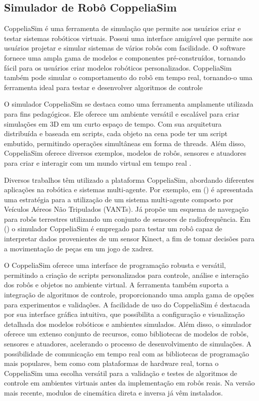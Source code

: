 \subsection{Simulador de Robô CoppeliaSim}

CoppeliaSim é uma ferramenta de simulação que permite aos usuários criar e testar sistemas robóticos virtuais. Possui uma interface amigável que permite aos usuários projetar e simular sistemas de vários robôs com facilidade. O software fornece uma ampla gama de modelos e componentes pré-construídos, tornando fácil para os usuários criar modelos robóticos personalizados. CoppeliaSim também pode simular o comportamento do robô em tempo real, tornando-o uma ferramenta ideal para testar e desenvolver algoritmos de controle \cite{nascimento2019}

O simulador CoppeliaSim se destaca como uma ferramenta amplamente utilizada para fins pedagógicos. Ele oferece um ambiente versátil e escalável para criar simulações em 3D em um curto espaço de tempo. Com sua arquitetura distribuída e baseada em scripts, cada objeto na cena pode ter um script embutido, permitindo operações simultâneas em forma de threads. Além disso, CoppeliaSim oferece diversos exemplos, modelos de robôs, sensores e atuadores para criar e interagir com um mundo virtual em tempo real \cite{Montenegro2022}.

 Diversos trabalhos têm utilizado a plataforma CoppeliaSim, abordando diferentes aplicações na robótica e sistemas multi-agente. Por exemplo, em  (\citeyear{Obdrzalek2017}) é apresentada uma estratégia para a utilização de um sistema multi-agente composto por Veículos Aéreos Não Tripulados (VANTs). Já  propõe um esquema de navegação para robôs terrestres utilizando um conjunto de sensores de radiofrequência. Em  (\citeyear{Tanberk2017}) o simulador CoppeliaSim é empregado para testar um robô capaz de interpretar dados provenientes de um sensor Kinect, a fim de tomar decisões para a movimentação de peças em um jogo de xadrez. 

 O CoppeliaSim oferece uma interface de programação robusta e versátil, permitindo a criação de scripts personalizados para controle, análise e interação dos robôs e objetos no ambiente virtual. A ferramenta também suporta a integração de algoritmos de controle, proporcionando uma ampla gama de opções para experimentos e validações. A facilidade de uso do CoppeliaSim é destacada por sua interface gráfica intuitiva, que possibilita a configuração e visualização detalhada dos modelos robóticos e ambientes simulados. Além disso, o simulador oferece um extenso conjunto de recursos, como bibliotecas de modelos de robôs, sensores e atuadores, acelerando o processo de desenvolvimento de simulações. A possibilidade de comunicação em tempo real com as bibliotecas de programação mais populares, bem como com plataformas de hardware real, torna o CoppeliaSim uma escolha versátil para a validação e testes de algoritmos de controle em ambientes virtuais antes da implementação em robôs reais. Na versão mais recente, modulos de cinemática direta e inversa já vêm instalados. 

